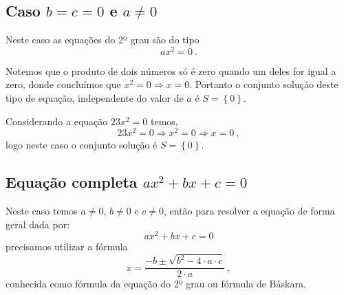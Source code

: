  \subsection{Caso \texorpdfstring{$b=c=0$ e $a \neq 0$}{b=c=0 e a não nulo}}

 Neste caso as equações do 2º grau são do tipo
\begin{equation}
ax^2 = 0 \ . 
\end{equation}

  Notemos que o produto de dois números só é zero quando um deles for igual a zero, donde concluímos que $x^2 = 0 \Rightarrow x =0$. Portanto o conjunto solução deste tipo de equação, independente do valor de $a$ é $S= \left\{ 0 \right\}$.

  \begin{exem} Considerando a equação $23x^2=0$ temos,
\begin{equation}
23x^2= 0 \Rightarrow x^2=0 \Rightarrow x= 0 \ , 
\end{equation}
  logo neste caso o conjunto solução é $S= \left\{ 0 \right\}$.
  \end{exem}

 \subsection{Equação completa \texorpdfstring{$ax^2+ bx + c = 0$}{ax² + bx + c = 0}}

 Neste caso temos $a \neq 0$, $b \neq 0$ e $c \neq 0$, então para resolver a equação de forma geral dada por:
\begin{equation}
ax^2+ bx + c = 0 
\end{equation}
 precisamos utilizar a fórmula
\begin{equation}
x = \dfrac{-b \pm \sqrt{b^2 - 4 \cdot a \cdot c}}{2 \cdot a} \ ,
\end{equation}
 conhecida como fórmula da equação do 2º grau ou fórmula de Báskara.

